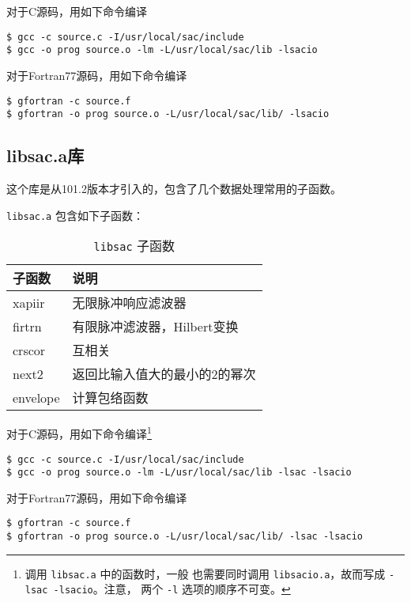 对于C源码，用如下命令编译
\begin{verbatim}
$ gcc -c source.c -I/usr/local/sac/include
$ gcc -o prog source.o -lm -L/usr/local/sac/lib -lsacio
\end{verbatim}

对于Fortran77源码，用如下命令编译
\begin{verbatim}
$ gfortran -c source.f
$ gfortran -o prog source.o -L/usr/local/sac/lib/ -lsacio
\end{verbatim}

\subsection{libsac.a库}
这个库是从101.2版本才引入的，包含了几个数据处理常用的子函数。

\texttt{libsac.a} 包含如下子函数：
\begin{table}[H]
\centering
\caption{\texttt{libsac} 子函数}
\ttfamily
\begin{tabular}{ll}
\toprule
子函数      &       说明            \\
\midrule
xapiir      &       无限脉冲响应滤波器 \\
firtrn      &       有限脉冲滤波器，Hilbert变换 \\
crscor      &       互相关 \\
next2       &       返回比输入值大的最小的2的幂次 \\
envelope    &       计算包络函数 \\
\bottomrule
\end{tabular}
\end{table}

对于C源码，用如下命令编译\footnote{调用 \texttt{libsac.a} 中的函数时，一般
也需要同时调用 \texttt{libsacio.a}，故而写成 \texttt{-lsac -lsacio}。注意，
两个 \texttt{-l} 选项的顺序不可变。}
\begin{verbatim}
$ gcc -c source.c -I/usr/local/sac/include
$ gcc -o prog source.o -lm -L/usr/local/sac/lib -lsac -lsacio
\end{verbatim}

对于Fortran77源码，用如下命令编译
\begin{verbatim}
$ gfortran -c source.f
$ gfortran -o prog source.o -L/usr/local/sac/lib/ -lsac -lsacio
\end{verbatim}
